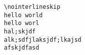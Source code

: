 \documentclass{article}
\begin{document}
\begin{\outputsize}
\begin{lstlisting}
\nointerlineskip
hello world
hello worl
hal;skjdf 
alk;sdfjlaksjdf;lkajsd
afskjdfasd
\end{lstlisting}
\end{\outputsize}
\end{document}
